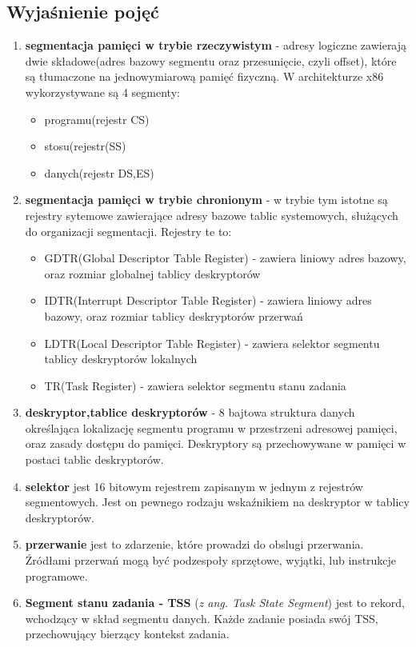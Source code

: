 \documentclass[a4paper,12pt]{article}
\begin{document}
	\subsection{Wyjaśnienie pojęć}
		\begin{enumerate}
				\item{\textbf{segmentacja pamięci w trybie rzeczywistym} - adresy logiczne zawierają dwie składowe(adres bazowy segmentu oraz przesunięcie, czyli offset), które są tłumaczone na jednowymiarową pamięć fizyczną. W architekturze x86 wykorzystywane są 4 segmenty:}
					\begin{itemize}
					\item{programu(rejestr CS)}
					\item{stosu(rejestr(SS)}
					\item{danych(rejestr DS,ES)}
					\end{itemize}
				\item{\textbf{segmentacja pamięci w trybie chronionym} - w trybie tym istotne są rejestry sytemowe zawierające adresy bazowe tablic systemowych, służących do organizacji segmentacji. Rejestry te to:}
					\begin{itemize}
						\item{GDTR(Global Descriptor Table Register) - zawiera liniowy adres bazowy, oraz rozmiar globalnej tablicy deskryptorów}
						\item{IDTR(Interrupt Descriptor Table Register) - zawiera liniowy adres bazowy, oraz rozmiar tablicy deskryptorów przerwań}
						\item{LDTR(Local Descriptor Table Register) - zawiera selektor segmentu tablicy deskryptorów lokalnych}
						\item{TR(Task Register) - zawiera selektor segmentu stanu zadania}
					\end{itemize}
				\item {\textbf{deskryptor,tablice deskryptorów }- 8 bajtowa struktura danych określająca lokalizację segmentu programu w przestrzeni adresowej pamięci, oraz zasady dostępu do pamięci. Deskryptory są przechowywane w pamięci w postaci tablic deskryptorów.}
				\item{\textbf{selektor} jest 16 bitowym rejestrem zapisanym w jednym z rejestrów segmentowych. Jest on pewnego rodzaju wskaźnikiem na deskryptor w tablicy deskryptorów.}
					
				\item{\textbf{przerwanie} jest to zdarzenie, które prowadzi do obslugi przerwania. Źródłami przerwań mogą być podzespoły sprzętowe, wyjątki, lub instrukcje programowe. }
				\item{\textbf{Segment stanu zadania - TSS} (\textit{z ang. Task State Segment}) jest to rekord, wchodzący w skład segmentu danych. Każde zadanie posiada swój TSS, przechowujący bierzący kontekst zadania.}
		\end{enumerate}
	
\end{document}
